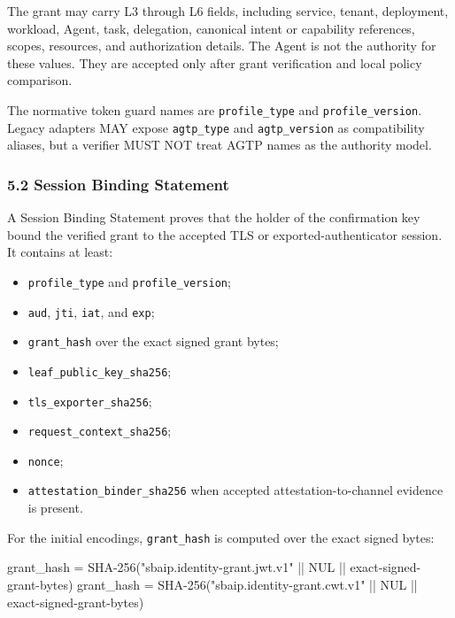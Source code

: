 \documentclass[
]{article}
\newenvironment{Shaded}{}{}
\newcommand{\NormalTok}[1]{#1}
\providecommand{\tightlist}{%
  \setlength{\itemsep}{0pt}\setlength{\parskip}{0pt}}
\begin{document}
The grant may carry L3 through L6 fields, including service, tenant,
deployment, workload, Agent, task, delegation, canonical intent or
capability references, scopes, resources, and authorization details. The
Agent is not the authority for these values. They are accepted only
after grant verification and local policy comparison.

The normative token guard names are \texttt{profile\_type} and
\texttt{profile\_version}. Legacy adapters MAY expose
\texttt{agtp\_type} and \texttt{agtp\_version} as compatibility aliases,
but a verifier MUST NOT treat AGTP names as the authority model.

\subsubsection{5.2 Session Binding
Statement}\label{session-binding-statement}

A Session Binding Statement proves that the holder of the confirmation
key bound the verified grant to the accepted TLS or
exported-authenticator session. It contains at least:

\begin{itemize}
\tightlist
\item
  \texttt{profile\_type} and \texttt{profile\_version};
\item
  \texttt{aud}, \texttt{jti}, \texttt{iat}, and \texttt{exp};
\item
  \texttt{grant\_hash} over the exact signed grant bytes;
\item
  \texttt{leaf\_public\_key\_sha256};
\item
  \texttt{tls\_exporter\_sha256};
\item
  \texttt{request\_context\_sha256};
\item
  \texttt{nonce};
\item
  \texttt{attestation\_binder\_sha256} when accepted
  attestation-to-channel evidence is present.
\end{itemize}

For the initial encodings, \texttt{grant\_hash} is computed over the
exact signed bytes:

\begin{Shaded}
\begin{Highlighting}[]
\NormalTok{grant\_hash = SHA{-}256("sbaip.identity{-}grant.jwt.v1" || NUL || exact{-}signed{-}grant{-}bytes)}
\NormalTok{grant\_hash = SHA{-}256("sbaip.identity{-}grant.cwt.v1" || NUL || exact{-}signed{-}grant{-}bytes)}
\end{Highlighting}
\end{Shaded}
\end{document}
